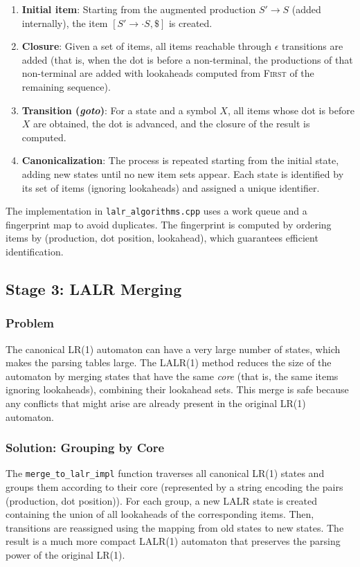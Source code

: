 \documentclass[12pt,a4paper]{report}
\begin{document}
\begin{enumerate}
    \item \textbf{Initial item}: Starting from the augmented production $S' \to S$ (added internally), the item $[S' \to \cdot S, \$]$ is created.
    \item \textbf{Closure}: Given a set of items, all items reachable through $\epsilon$ transitions are added (that is,
    when the dot is before a non-terminal, the productions of that non-terminal are added with lookaheads computed from \textsc{First} of the remaining sequence).
    \item \textbf{Transition (\textit{goto})}: For a state and a symbol $X$, all items whose dot is before $X$ are obtained, the dot is advanced, and the closure of the result is computed.
    \item \textbf{Canonicalization}: The process is repeated starting from the initial state, adding new states until no new item sets appear.
    Each state is identified by its set of items (ignoring lookaheads) and assigned a unique identifier.
\end{enumerate}

The implementation in \texttt{lalr\_algorithms.cpp} uses a work queue and a fingerprint map to avoid duplicates.
The fingerprint is computed by ordering items by (production, dot position, lookahead), which guarantees efficient identification.

\subsection{Stage 3: LALR Merging}

\subsubsection{Problem}
The canonical LR(1) automaton can have a very large number of states, which makes the parsing tables large.
The LALR(1) method reduces the size of the automaton by merging states that have the same \textit{core} (that is, the same items ignoring lookaheads), combining their lookahead sets.
This merge is safe because any conflicts that might arise are already present in the original LR(1) automaton.

\subsubsection{Solution: Grouping by Core}
The \texttt{merge\_to\_lalr\_impl} function traverses all canonical LR(1) states and groups them according to their core
(represented by a string encoding the pairs (production, dot position)).
For each group,
a new LALR state is created containing the union of all lookaheads of the corresponding items.
Then, transitions are reassigned using the mapping from old states to new states.
The result is a much more compact LALR(1) automaton that preserves the parsing power of the original LR(1).
\end{document}
